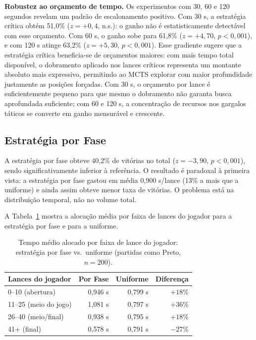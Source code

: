 \documentclass[cic,tc]{iiufrgs}
\begin{document}
\textbf{Robustez ao orçamento de tempo.} Os experimentos com 30, 60 e 120 segundos revelam um padrão de escalonamento positivo. Com 30 s, a estratégia crítica obtém 51,0\% ($z = +0{,}4$, n.s.): o ganho não é estatisticamente detectável com esse orçamento. Com 60 s, o ganho sobe para 61,8\% ($z = +4{,}70$, $p < 0{,}001$), e com 120 s atinge 63,2\% ($z = +5{,}30$, $p < 0{,}001$). Esse gradiente sugere que a estratégia crítica beneficia-se de orçamentos maiores: com mais tempo total disponível, o dobramento aplicado nos lances críticos representa um montante absoluto mais expressivo, permitindo ao MCTS explorar com maior profundidade justamente as posições forçadas. Com 30 s, o orçamento por lance é suficientemente pequeno para que mesmo o dobramento não garanta busca aprofundada suficiente; com 60 e 120 s, a concentração de recursos nos gargalos táticos se converte em ganho mensurável e crescente.

\subsection{Estratégia por Fase}
\label{sec:results_phase}

A estratégia por fase obteve 40,2\% de vitórias no total ($z = -3{,}90$, $p < 0{,}001$), sendo significativamente inferior à referência. O resultado é paradoxal à primeira vista: a estratégia por fase gastou em média 0,900 s/lance (13\% a mais que a uniforme) e ainda assim obteve menor taxa de vitórias. O problema está na distribuição temporal, não no volume total.

A Tabela~\ref{tab:phase_time} mostra a alocação média por faixa de lances do jogador para a estratégia por fase e para a uniforme.

\begin{table}[htbp]
    \centering
    \caption{Tempo médio alocado por faixa de lance do jogador: estratégia por fase vs.\ uniforme (partidas como Preto, $n = 200$).}
    \label{tab:phase_time}
    \begin{tabular}{lrrr}
        \hline
        \textbf{Lances do jogador} & \textbf{Por Fase} & \textbf{Uniforme} & \textbf{Diferença} \\
        \hline
        0--10   (abertura)         & 0,946 s & 0,799 s & $+18\%$ \\
        11--25  (meio do jogo)     & 1,081 s & 0,797 s & $+36\%$ \\
        26--40  (meio/final)       & 0,938 s & 0,795 s & $+18\%$ \\
        41+     (final)            & 0,578 s & 0,791 s & $-27\%$ \\
        \hline
    \end{tabular}
\end{table}
\end{document}
